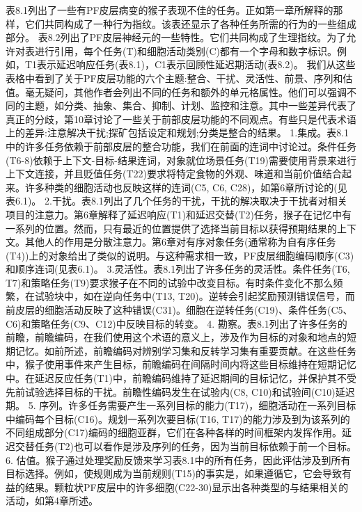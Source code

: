 表8.1列出了一些有PF皮层病变的猴子表现不佳的任务。正如第一章所解释的那样，它们共同构成了一种行为指纹。该表还显示了各种任务所需的行为的一些组成部分。
表8.2列出了PF皮层神经元的一些特性。它们共同构成了生理指纹。为了允许对表进行引用，每个任务(T)和细胞活动类别(C)都有一个字母和数字标识。例如，T1表示延迟响应任务(表8.1)，C1表示回顾性延迟期活动(表8.2)。
我们从这些表格中看到了关于PF皮层功能的六个主题:整合、干扰、灵活性、前景、序列和估值。毫无疑问，其他作者会列出不同的任务和额外的单元格属性。他们可以强调不同的主题，如分类、抽象、集合、抑制、计划、监控和注意。其中一些差异代表了真正的分歧，第10章讨论了一些关于前部皮层功能的不同观点。有些只是代表术语上的差异:注意解决干扰;探矿包括设定和规划;分类是整合的结果。
1.集成。表8.1中的许多任务依赖于前部皮层的整合功能，我们在前面的连词中讨论过。条件任务(T6-8)依赖于上下文-目标-结果连词，对象就位场景任务(T19)需要使用背景来进行上下文连接，并且贬值任务(T22)要求将特定食物的外观、味道和当前价值结合起来。许多种类的细胞活动也反映这样的连词(C5, C6, C28)，如第6章所讨论的(见表6.1)。
2.干扰。表8.1列出了几个任务的干扰，干扰的解决取决于干扰者对相关项目的注意力。第6章解释了延迟响应(T1)和延迟交替(T2)任务，猴子在记忆中有一系列的位置。然而，只有最近的位置提供了选择当前目标以获得预期结果的上下文。其他人的作用是分散注意力。第6章对有序对象任务(通常称为自有序任务(T4))上的对象给出了类似的说明。与这种需求相一致，PF皮层细胞编码顺序(C3)和顺序连词(见表6.1)。
3.灵活性。表8.1列出了许多任务的灵活性。条件任务(T6, T7)和策略任务(T9)要求猴子在不同的试验中改变目标。有时条件变化不那么频繁，在试验块中，如在逆向任务中(T13, T20)。逆转会引起奖励预测错误信号，而前皮层的细胞活动反映了这种错误(C31)。细胞在逆转任务(C19)、条件任务(C5、C6)和策略任务(C9、C12)中反映目标的转变。
4. 勘察。表8.1列出了许多任务的前瞻，前瞻编码，在我们使用这个术语的意义上，涉及作为目标的对象和地点的短期记忆。如前所述，前瞻编码对辨别学习集和反转学习集有重要贡献。在这些任务中，猴子使用事件来产生目标，前瞻编码在间隔时间内将这些目标维持在短期记忆中。在延迟反应任务(T1)中，前瞻编码维持了延迟期间的目标记忆，并保护其不受先前试验选择目标的干扰。前瞻性编码发生在试验内(C8, C10)和试验间(C10)延迟期。
5. 序列。许多任务需要产生一系列目标的能力(T17)，细胞活动在一系列目标中编码每个目标(C16)。规划一系列次要目标(T16, T17)的能力涉及到为该系列的不同组成部分(C17)编码的细胞亚群，它们在各种各样的时间框架内发挥作用。延迟交替任务(T2)也可以看作是涉及序列的任务，因为当前目标依赖于前一个目标。
6. 估值。猴子通过处理奖励反馈来学习表8.1中的所有任务，因此评估涉及到所有目标选择。例如，使规则成为当前规则(T15)的事实是，如果遵循它，它会导致有益的结果。颗粒状PF皮层中的许多细胞(C22-30)显示出各种类型的与结果相关的活动，如第4章所述。


